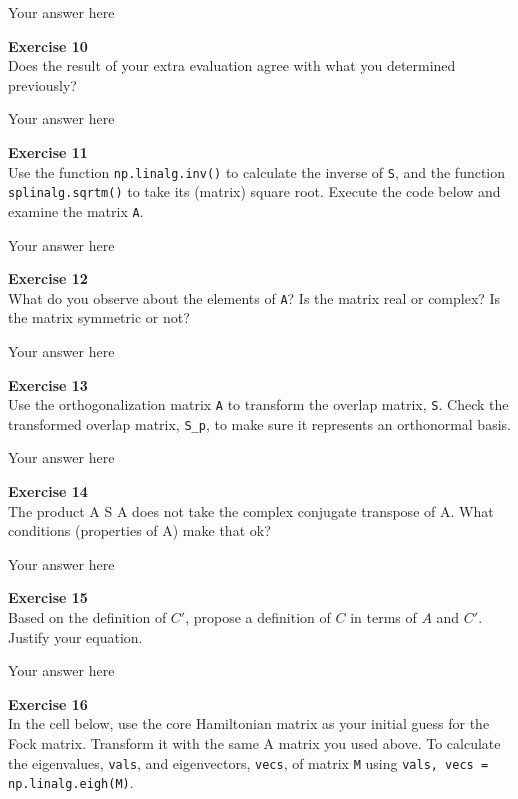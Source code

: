 \documentclass{article}
\begin{document}
Your answer here

\begin{mdframed}
\textbf{Exercise 10}\\
Does the result of your extra evaluation agree with what you determined previously?
\end{mdframed}

Your answer here

\begin{mdframed}
\textbf{Exercise 11}\\
Use the function \texttt{np.linalg.inv()} to calculate the inverse of \texttt{S}, and the function \texttt{splinalg.sqrtm()} to take its (matrix) square root. Execute the code below and examine the matrix \texttt{A}.
\end{mdframed}

Your answer here

\begin{mdframed}
\textbf{Exercise 12}\\
What do you observe about the elements of \texttt{A}? Is the matrix real or complex? Is the matrix symmetric or not?
\end{mdframed}

Your answer here

\begin{mdframed}
\textbf{Exercise 13}\\
Use the orthogonalization matrix \texttt{A} to transform the overlap matrix, \texttt{S}. Check the transformed overlap matrix, \texttt{S\_p}, to make sure it represents an orthonormal basis.
\end{mdframed}

Your answer here

\begin{mdframed}
\textbf{Exercise 14}\\
The product A S A does not take the complex conjugate transpose of A. What conditions (properties of A) make that ok?
\end{mdframed}

Your answer here

\begin{mdframed}
\textbf{Exercise 15}\\
Based on the definition of $C'$, propose a definition of $C$ in terms of $A$ and $C'$. Justify your equation.
\end{mdframed}

Your answer here

\begin{mdframed}
\textbf{Exercise 16}\\
In the cell below, use the core Hamiltonian matrix as your initial guess for the Fock matrix. Transform it with the same A matrix you used above.  To calculate the eigenvalues, \texttt{vals}, and eigenvectors, \texttt{vecs}, of matrix \texttt{M} using  \texttt{vals, vecs = np.linalg.eigh(M)}.
\end{mdframed}
\end{document}
